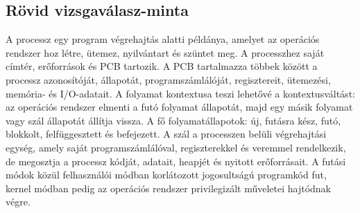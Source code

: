 \subsection{Rövid vizsgaválasz-minta}

\begin{summarybox}
A processz egy program végrehajtás alatti példánya, amelyet az operációs rendszer hoz létre, ütemez, nyilvántart és szüntet meg. A processzhez saját címtér, erőforrások és PCB tartozik. A PCB tartalmazza többek között a processz azonosítóját, állapotát, programszámlálóját, regisztereit, ütemezési, memória- és I/O-adatait. A folyamat kontextusa teszi lehetővé a kontextusváltást: az operációs rendszer elmenti a futó folyamat állapotát, majd egy másik folyamat vagy szál állapotát állítja vissza. A fő folyamatállapotok: új, futásra kész, futó, blokkolt, felfüggesztett és befejezett. A szál a processzen belüli végrehajtási egység, amely saját programszámlálóval, regiszterekkel és veremmel rendelkezik, de megosztja a processz kódját, adatait, heapjét és nyitott erőforrásait. A futási módok közül felhasználói módban korlátozott jogosultságú programkód fut, kernel módban pedig az operációs rendszer privilegizált műveletei hajtódnak végre.
\end{summarybox}
